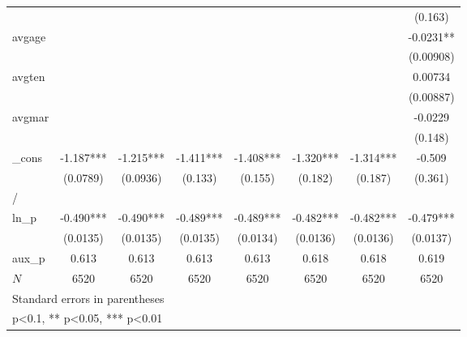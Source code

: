 \begin{table}[htbp]
\begin{tabular}{l*{7}{c}}
            &               &               &               &               &               &               &     (0.163)   \\
[1em]
avgage      &               &               &               &               &               &               &     -0.0231** \\
            &               &               &               &               &               &               &   (0.00908)   \\
[1em]
avgten      &               &               &               &               &               &               &     0.00734   \\
            &               &               &               &               &               &               &   (0.00887)   \\
[1em]
avgmar      &               &               &               &               &               &               &     -0.0229   \\
            &               &               &               &               &               &               &     (0.148)   \\
[1em]
\_cons      &      -1.187***&      -1.215***&      -1.411***&      -1.408***&      -1.320***&      -1.314***&      -0.509   \\
            &    (0.0789)   &    (0.0936)   &     (0.133)   &     (0.155)   &     (0.182)   &     (0.187)   &     (0.361)   \\
\hline
/           &               &               &               &               &               &               &               \\
ln\_p        &      -0.490***&      -0.490***&      -0.489***&      -0.489***&      -0.482***&      -0.482***&      -0.479***\\
            &    (0.0135)   &    (0.0135)   &    (0.0135)   &    (0.0134)   &    (0.0136)   &    (0.0136)   &    (0.0137)   \\
\hline
aux\_p       &       0.613   &       0.613   &       0.613   &       0.613   &       0.618   &       0.618   &       0.619   \\
\(N\)       &        6520   &        6520   &        6520   &        6520   &        6520   &        6520   &        6520   \\
\hline\hline
\multicolumn{8}{l}{\footnotesize Standard errors in parentheses}\\
\multicolumn{8}{l}{\footnotesize * p<0.1, ** p<0.05, *** p<0.01}\\
\end{tabular}
\end{table}
